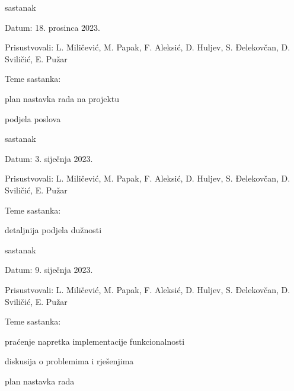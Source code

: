 \begin{packed_enum}
			\item  sastanak
			\item[] \begin{packed_item}
				\item Datum: 18. prosinca 2023.
				\item Prisustvovali: L. Miličević, M. Papak, F. Aleksić, D. Huljev, S. Đelekovčan, D. Sviličić, E. Pužar
				\item Teme sastanka:
				\begin{packed_item}
					\item plan nastavka rada na projektu
					\item podjela poslova
				\end{packed_item}
			\end{packed_item}

			\item  sastanak
			\item[] \begin{packed_item}
				\item Datum: 3. siječnja 2023.
				\item Prisustvovali: L. Miličević, M. Papak, F. Aleksić, D. Huljev, S. Đelekovčan, D. Sviličić, E. Pužar
				\item Teme sastanka:
				\begin{packed_item}
					\item detaljnija podjela dužnosti
				\end{packed_item}
			\end{packed_item}

			\item  sastanak
			\item[] \begin{packed_item}
				\item Datum: 9. siječnja 2023.
				\item Prisustvovali: L. Miličević, M. Papak, F. Aleksić, D. Huljev, S. Đelekovčan, D. Sviličić, E. Pužar
				\item Teme sastanka:
				\begin{packed_item}
					\item praćenje napretka implementacije funkcionalnosti
					\item diskusija o problemima i rješenjima
					\item plan nastavka rada
				\end{packed_item}
			\end{packed_item}


\end{packed_enum}
